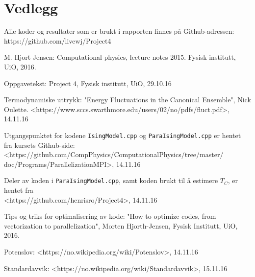 \documentclass[11pt,a4paper]{article}
\begin{document}
\section{Vedlegg}
Alle koder og resultater som er brukt i rapporten finnes på Github-adressen: \\
https://github.com/livewj/Project4



\begin{thebibliography}{9}  
    
\bibitem{}
   M. Hjort-Jensen: Computational physics, lecture notes 2015. Fysisk institutt, UiO, 2016.

\bibitem{}
   Oppgavetekst: Project 4, Fysisk institutt, UiO, 29.10.16
   
 \bibitem{}
   Termodynamiske uttrykk: "Energy Fluctuations in the Canonical Ensemble", Nick Oulette. <https://www.sccs.swarthmore.edu/users/02/no/pdfs/fluct.pdf>, 14.11.16
  
  \bibitem{}
  Utgangspunktet for kodene \texttt{IsingModel.cpp} og \texttt{ParaIsingModel.cpp} er hentet fra kursets Github-side:
  <https://github.com/CompPhysics/ComputationalPhysics/tree/master/\\
  doc/Programs/ParallelizationMPI>, 14.11.16
  
\bibitem{}
  Deler av koden i \texttt{ParaIsingModel.cpp}, samt koden brukt til å estimere $T_C$, er hentet fra \\ <https://github.com/henrisro/Project4>,
  14.11.16

\bibitem{}
 Tips og triks for optimalisering av kode:
 "How to optimize codes, from vectorization to parallelization", Morten Hjorth-Jensen, Fysisk Institutt, UiO, 2016.
 
\bibitem{}
  Potenslov:
 <https://no.wikipedia.org/wiki/Potenslov>, 14.11.16

\bibitem{}
 Standardavvik:
 <https://no.wikipedia.org/wiki/Standardavvik>, 15.11.16
   
\end{thebibliography}
\end{document}
